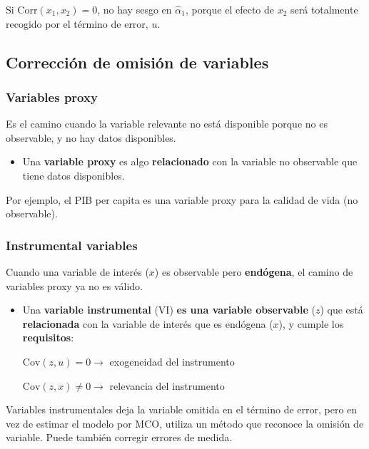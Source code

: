 \documentclass[10pt, a4paper, landscape]{article}
\newcommand{\Cov}{\mathrm{Cov}}
\newcommand{\Corr}{\mathrm{Corr}}
\begin{document}
\begin{multicols}{3}
		Si $\Corr(x_{1}, x_{2}) = 0$, no hay sesgo en $\hat{\alpha}_{1}$, porque el efecto de $x_{2}$ será totalmente recogido por el término de error, $u$.
		
		\columnbreak
		
		\subsection*{Corrección de omisión de variables}
		
		\subsubsection*{Variables proxy}
		
		Es el camino cuando la variable relevante no está disponible porque no es observable, y no hay datos disponibles.
		
		\begin{itemize}[leftmargin=*]
			\item Una \textbf{variable proxy} es algo \textbf{relacionado} con la variable no observable que tiene datos disponibles.
		\end{itemize}
		
		Por ejemplo, el PIB per capita es una variable proxy para la calidad de vida (no observable).
		
		\subsubsection*{Instrumental variables}
		
		Cuando una variable de interés ($x$) es observable pero \textbf{endógena}, el camino de variables proxy ya no es válido.
		
		\begin{itemize}[leftmargin=*]
			\item Una \textbf{variable instrumental} (VI) \textbf{es una variable observable} ($z$) que está \textbf{relacionada} con la variable de interés que es endógena ($x$), y cumple los \textbf{requisitos}:
			
			\begin{center}
				$\Cov(z, u) = 0 \rightarrow$ exogeneidad del instrumento
				
				$\Cov(z, x) \neq 0 \rightarrow$ relevancia del instrumento
			\end{center}
		\end{itemize}
		
		Variables instrumentales deja la variable omitida en el término de error, pero en vez de estimar el modelo por MCO, utiliza un método que reconoce la omisión de variable. Puede también corregir errores de medida.
		

\end{multicols}
\end{document}
